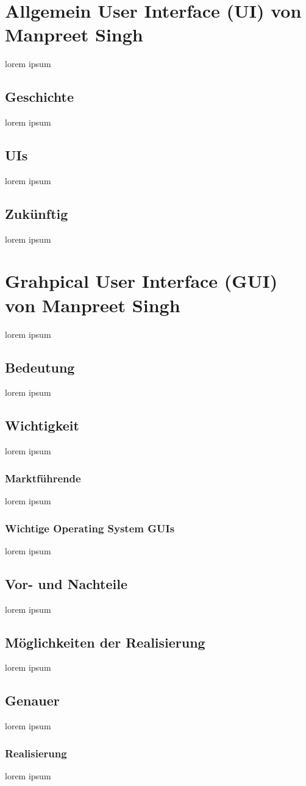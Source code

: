 \documentclass[12pt,a4paper]{report}
\begin{document}
\begin{onehalfspace}
\section{Allgemein User Interface (UI) von Manpreet Singh}
lorem ipsum
\subsection{Geschichte}
lorem ipsum
\subsection{UIs}
lorem ipsum 
\subsection{Zukünftig}
lorem ipsum 
\section{Grahpical User Interface (GUI) von Manpreet Singh}
lorem ipsum
\subsection{Bedeutung}
lorem ipsum
\subsection{Wichtigkeit}
lorem ipsum
\subsubsection{Marktführende}
lorem ipsum
\subsubsection{Wichtige Operating System GUIs}
lorem ipsum
\subsection{Vor- und Nachteile}
lorem ipsum
\subsection{Möglichkeiten der Realisierung}
lorem ipsum
\subsection{Genauer}
lorem ipsum
\subsubsection{Realisierung}
lorem ipsum

\end{onehalfspace}
\end{document}
